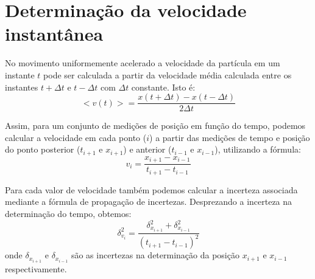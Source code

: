 \chapter{Determinação da velocidade instantânea}
\label{sec:vinst}

No movimento uniformemente acelerado a velocidade da partícula em um instante $t$ pode ser calculada a partir da velocidade média calculada entre os instantes $t + \Delta t$ e $t - \Delta t$ com $\Delta t$ constante. Isto é:
\begin{equation}
< v(t) > = \frac{x(t+ \Delta t) - x (t - \Delta t)}{2 \Delta t}
\end{equation}
\noindent

Assim, para um conjunto de medições de posição em função do tempo, podemos calcular a velocidade em cada ponto ($i$) a partir das medições de tempo e posição do ponto posterior ($t_{i+1}$ e $x_{i+1}$) e anterior ($t_{i-1}$ e $x_{i-1}$), utilizando a fórmula: 
\begin{equation}
v_i = \frac{x_{i+1}-x_{i-1}}{t_{i+1} -t_{i-1}}
\end{equation}
\noindent

Para cada valor de velocidade também podemos calcular a incerteza associada mediante a fórmula de propagação de incertezas. Desprezando a incerteza na determinação do tempo, obtemos:\begin{equation}
\delta^2_{v_i} = \frac{\delta^2_{x_{i+1}}+\delta^2_{x_{i-1}}}{(t_{i+1} -t_{i-1})^2}
\end{equation}
\noindent
onde $\delta_{x_{i+1}}$ e $\delta_{x_{i-1}}$ são as incertezas na determinação da posição ${x_{i+1}}$ e ${x_{i-1}}$ respectivamente.


